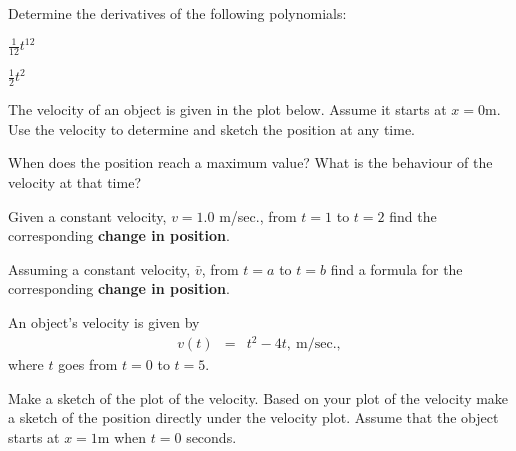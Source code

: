 \begin{problem}
\item Determine the derivatives of the following polynomials:
  \begin{subproblem}
    \item $\frac{1}{12} t^{12}$
      \vfill
    \item $\frac{1}{2} t^{2}$
      \vfill
  \end{subproblem}

\item The velocity of an object is given in the plot below. Assume it
  starts at $x=0$m. Use the velocity to determine and sketch the
  position at any time.

  \scalebox{0.7}{}


  \begin{subproblem}
  \item When does the position reach a maximum value? What is the
    behaviour of the velocity at that time?    \vspace{3em}
  \item Given a constant velocity, $v=1.0$ m/sec., from $t=1$ to $t=2$
    find the corresponding \textbf{change in position}.
    \vfill
  \item Assuming a constant velocity, $\bar{v}$, from $t=a$ to $t=b$
    find a formula for the corresponding \textbf{change in position}.
    \vfill
  \end{subproblem}

\item An object's velocity is given by
  \begin{eqnarray}
    \label{eqn:parabolicVelOne}
    v(t) & = & t^2 - 4t, ~ \mathrm{m/sec.},
  \end{eqnarray}
  where $t$ goes from $t=0$ to $t=5$.

  \begin{subproblem}
  \item Make a sketch of the plot of the velocity.  Based on your plot
    of the velocity make a sketch of the position directly under the
    velocity plot. Assume that the object starts at $x=1$m when $t=0$
    seconds.  

    \vfill


\end{subproblem}
\end{problem}
